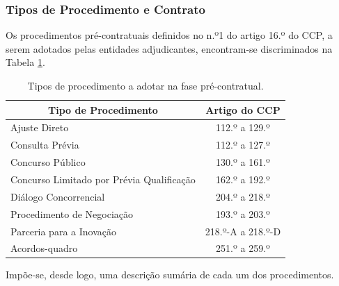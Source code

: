\subsubsection{Tipos de Procedimento e Contrato}
Os procedimentos pré-contratuais definidos no n.º1 do artigo 16.º do CCP, a serem adotados pelas entidades adjudicantes, encontram-se discriminados na Tabela \ref{table:2}.

\begin{table}[ht]
	\centering
	\renewcommand{\arraystretch}{1.15}
	\setlength{\tabcolsep}{15pt}
		\begin{tabular}{lc}
			\toprule
			\multicolumn{1}{c}{\textbf{Tipo de Procedimento}} & \textbf{Artigo do CCP} \\ 
			\midrule
			\rowcolor[HTML]{EFEFEF} 
			Ajuste Direto                                     & 112.º a 129.º          \\ 
			Consulta Prévia                                   & 112.º a 127.º          \\
			\rowcolor[HTML]{EFEFEF} 
			Concurso Público                                  & 130.º a 161.º          \\
			Concurso Limitado por Prévia Qualificação         & 162.º a 192.º          \\
			\rowcolor[HTML]{EFEFEF} 
			Diálogo Concorrencial                             & 204.º a 218.º          \\
			Procedimento de Negociação                        & 193.º a 203.º          \\
			\rowcolor[HTML]{EFEFEF} 
			Parceria para a Inovação                          & 218.º-A a 218.º-D      \\
			Acordos-quadro                                    & 251.º a 259.º          \\                             
			\bottomrule
		\end{tabular}
	\caption{Tipos de procedimento a adotar na fase pré-contratual.}
	\label{table:2}
\end{table}

Impõe-se, desde logo, uma descrição sumária de cada um dos procedimentos.


